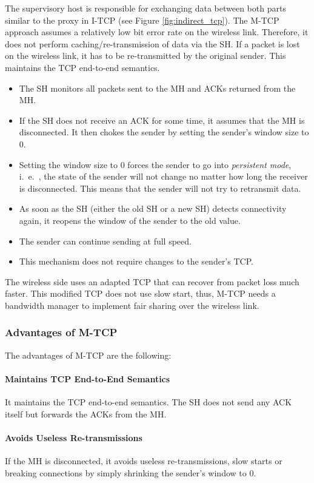 The supervisory host is responsible for exchanging data between both parts similar to the proxy in I-TCP (see Figure \ref{fig:indirect_tcp}). The M-TCP approach assumes a relatively low bit error rate on the wireless link. Therefore, it does not perform caching/re-transmission of data via the SH. If a packet is lost on the wireless link, it has to be re-transmitted by the original sender. This maintains the TCP end-to-end semantics.

\begin{itemize}
	\item The SH monitors all packets sent to the MH and ACKs returned from the MH. 
	\item If the SH does not receive an ACK for some time, it assumes that the MH is disconnected. It then chokes the sender by setting the sender’s window size to 0.
	\item Setting the window size to 0 forces the sender to go into \textit{persistent mode}, i.\ e.\ ,
	the state of the sender will not change no matter how long the receiver is disconnected. This means that the sender will not try to retransmit data. 
	\item As soon as the SH (either the old SH or a new SH) detects connectivity again, it reopens the window of the sender to the old value. 
	\item The sender can continue sending at full speed. 
	\item This mechanism does not require changes to the sender’s TCP.
\end{itemize}
The wireless side uses an adapted TCP that can recover from packet loss much faster. This modified TCP does not use slow start, thus, M-TCP needs a bandwidth manager to implement fair sharing over the wireless link.

\subsubsection[Advantages]{Advantages of M-TCP}
The advantages of M-TCP are the following:

\paragraph*{Maintains TCP End-to-End Semantics}
It maintains the TCP end-to-end semantics. The SH does not send any ACK
itself but forwards the ACKs from the MH.

\paragraph*{Avoids Useless Re-transmissions}
If the MH is disconnected, it avoids useless re-transmissions, slow starts or
breaking connections by simply shrinking the sender’s window to 0.

